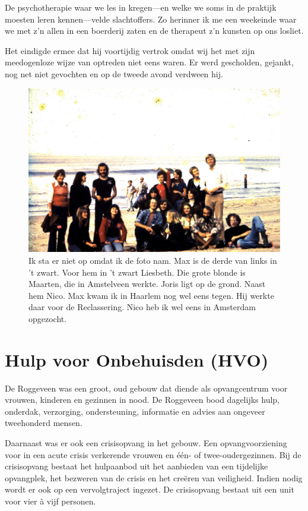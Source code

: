 \documentclass[10pt,twoside, openright]{memoir}
\begin{document}
De psychotherapie waar we les in kregen---en welke we soms in de praktijk moesten leren kennen---velde slachtoffers. Zo herinner ik me een weekeinde waar we met z’n allen in een boerderij zaten en de therapeut z’n kunsten op ons losliet. 

Het eindigde ermee dat hij voortijdig vertrok omdat wij het met zijn meedogenloze wijze van optreden niet eens waren. Er werd gescholden, gejankt, nog net niet gevochten en op de tweede avond verdween hij.

\begin{figure}
\includegraphics[width=\textwidth]{img/ch42/4-9-2009_002}
\caption*{\footnotesize Ik sta er niet op omdat ik de foto nam. Max is de derde van links in ’t zwart. Voor hem in ’t zwart Liesbeth. Die grote blonde is Maarten, die in Amstelveen werkte. Joris ligt op de grond. Naast hem Nico. Max kwam ik in Haarlem nog wel eens tegen. Hij werkte daar voor de Reclassering. Nico heb ik wel eens in Amsterdam opgezocht.}
\end{figure}

\chapter{Hulp voor Onbehuisden (HVO)} %
\label{cha:hvo}

De Roggeveen was een groot, oud gebouw dat diende als opvangcentrum voor vrouwen, kinderen en gezinnen in nood. De Roggeveen bood dagelijks hulp, onderdak, verzorging, ondersteuning, informatie en advies aan ongeveer tweehonderd mensen.

Daarnaast was er ook een crisisopvang in het gebouw. Een opvangvoorziening voor in een acute crisis verkerende vrouwen en één- of twee-oudergezinnen. Bij de crisisopvang bestaat het hulpaanbod uit het aanbieden van een tijdelijke opvangplek, het bezweren van de crisis en het creëren van veiligheid. Indien nodig wordt er ook op een vervolgtraject ingezet. De crisisopvang bestaat uit een unit voor vier à vijf personen.
\end{document}

